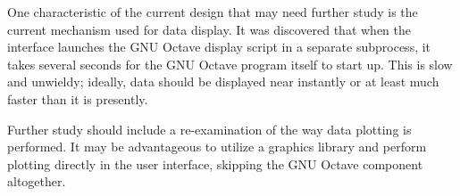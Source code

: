 One characteristic of the current design that may need further study is the current
mechanism used for data display. It was discovered that when the interface launches
the GNU Octave display script in a separate subprocess, it takes several seconds
for the GNU Octave program itself to start up. This is slow and unwieldy; ideally,
data should be displayed near instantly or at least much faster than it is presently.

Further study should include a re-examination of the way data plotting is performed. 
It may be advantageous to utilize a graphics library and perform plotting directly 
in the user interface, skipping the GNU Octave component altogether.
